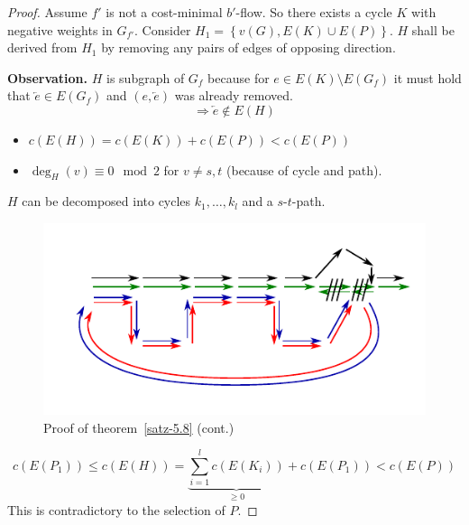 \documentclass{article}
\newcommand{\set}[1]{\left\{#1\right\}}
\newcommand{\gath}[2]{$#1$-$#2$-path} %
\begin{document}
\begin{proof}
  Assume $f'$ is not a cost-minimal $b'$-flow. So there exists a cycle $K$ with negative weights in $G_{f'}$.
  Consider $H_1 = \set{v(G), E(K) \cup E(P)}$. $H$ shall be derived from $H_1$ by removing any pairs of edges of opposing direction.

  \textbf{Observation.} $H$ is subgraph of $G_f$ because for $e \in E(K) \setminus E(G_f)$ it must hold that $\overleftarrow{e} \in E(G_f)$ and $(e, \overleftarrow{e})$ was already removed.
  \[ \Rightarrow \overleftarrow{e} \notin E(H) \]

  \begin{itemize}
    \item $c(E(H)) = c(E(K)) + c(E(P)) < c(E(P))$
    \item $\deg_H(v) \equiv 0 \mod{2}$ for $v \neq s, t$ (because of cycle and path).
  \end{itemize}

  $H$ can be decomposed into cycles $k_1, \ldots, k_l$ and a \gath st.

  \begin{figure}[ht]
   \begin{center}
    \includegraphics{img/satz_5_8_proof.pdf}
    \caption{Proof of theorem~\ref{satz-5.8} (cont.)}
   \end{center}
  \end{figure}

  \[ c(E(P_1)) \leq c(E(H)) = \underbrace{\sum_{i=1}^l c(E(K_i))}_{\geq 0} + c(E(P_1)) < c(E(P)) \]
  This is contradictory to the selection of $P$.
\end{proof}
\end{document}
